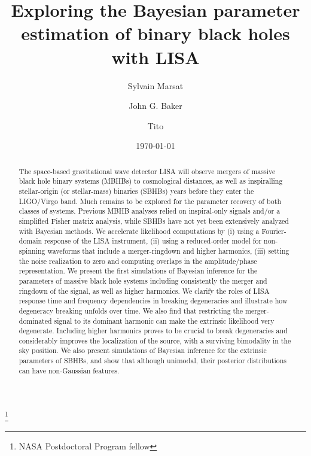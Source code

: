 \documentclass[aps,showpacs,twocolumn,prd,superscriptaddress,nofootinbib]{revtex4-1}
\begin{document}
\title{Exploring the Bayesian parameter estimation of binary black holes with LISA}

\author{Sylvain Marsat}
\author{John G. Baker}
\author{Tito }
\thanks{NASA Postdoctoral Program fellow}


\date{\today}

\begin{abstract}

The space-based gravitational wave detector LISA will observe mergers of massive black hole binary systems (MBHBs) to cosmological distances, as well as inspiralling stellar-origin (or stellar-mass) binaries (SBHBs) years before they enter the LIGO/Virgo band. Much remains to be explored for the parameter recovery of both classes of systems. Previous MBHB analyses relied on inspiral-only signals and/or a simplified Fisher matrix analysis, while SBHBs have not yet been extensively analyzed with Bayesian methods. We accelerate likelihood computations by (i) using a Fourier-domain response of the LISA instrument, (ii) using a reduced-order model for non-spinning waveforms that include a merger-ringdown and higher harmonics, (iii) setting the noise realization to zero and computing overlaps in the amplitude/phase representation. We present the first simulations of Bayesian inference for the parameters of massive black hole systems including consistently the merger and ringdown of the signal, as well as higher harmonics. We clarify the roles of LISA response time and frequency dependencies in breaking degeneracies and illustrate how degeneracy breaking unfolds over time.  We also find that restricting the merger-dominated signal to its dominant harmonic can make the extrinsic likelihood very degenerate. Including higher harmonics proves to be crucial to break degeneracies and considerably improves the localization of the source, with a surviving bimodality in the sky position. We also present simulations of Bayesian inference for the extrinsic parameters of SBHBs, and show that although unimodal, their posterior distributions can have non-Gaussian features.

\end{abstract}
\end{document}

